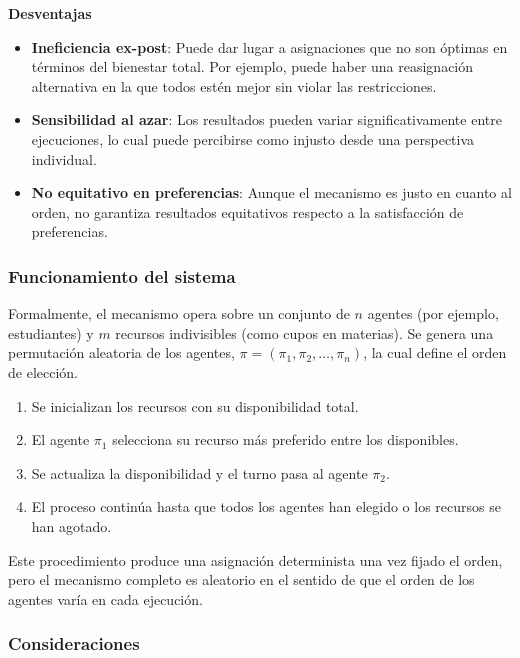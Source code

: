 \documentclass{article}
\begin{document}
\textbf{Desventajas}
\begin{itemize}
    \item \textbf{Ineficiencia ex-post}: Puede dar lugar a asignaciones que no son óptimas en términos del bienestar total. Por ejemplo, puede haber una reasignación alternativa en la que todos estén mejor sin violar las restricciones.
    \item \textbf{Sensibilidad al azar}: Los resultados pueden variar significativamente entre ejecuciones, lo cual puede percibirse como injusto desde una perspectiva individual.
    \item \textbf{No equitativo en preferencias}: Aunque el mecanismo es justo en cuanto al orden, no garantiza resultados equitativos respecto a la satisfacción de preferencias.
\end{itemize}

\subsubsection{Funcionamiento del sistema}

Formalmente, el mecanismo opera sobre un conjunto de $n$ agentes (por ejemplo, estudiantes) y $m$ recursos indivisibles (como cupos en materias). Se genera una permutación aleatoria de los agentes, $\pi = (\pi_1, \pi_2, \ldots, \pi_n)$, la cual define el orden de elección.

\begin{enumerate}
    \item Se inicializan los recursos con su disponibilidad total.
    \item El agente $\pi_1$ selecciona su recurso más preferido entre los disponibles.
    \item Se actualiza la disponibilidad y el turno pasa al agente $\pi_2$.
    \item El proceso continúa hasta que todos los agentes han elegido o los recursos se han agotado.
\end{enumerate}

Este procedimiento produce una asignación determinista una vez fijado el orden, pero el mecanismo completo es aleatorio en el sentido de que el orden de los agentes varía en cada ejecución.

\subsubsection{Consideraciones}
\end{document}
